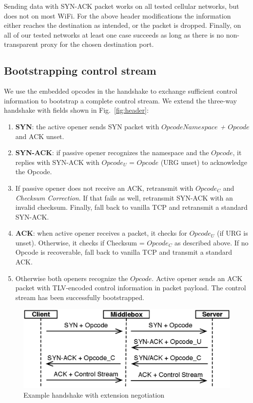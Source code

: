 \documentclass{sig-alternate-10pt}
\begin{document}
Sending data with SYN-ACK packet works on all tested cellular networks, but does not on most WiFi. For the above header modifications the information either reaches the destination as intended, or the packet is dropped. Finally, on all of our tested networks at least one case succeeds as long as there is no non-transparent proxy for the chosen destination port.

\subsection{Bootstrapping control stream}

We use the embedded opcodes in the handshake to exchange sufficient control information to bootstrap a complete control stream. We extend the three-way handshake with fields shown in Fig.~\ref{fig:header}:

\begin{enumerate}
\item \textbf{SYN}: the active opener sends SYN packet with \emph{$Opcode Namespace$ + $Opcode$} and ACK unset.
\item \textbf{SYN-ACK}: if passive opener recognizes the namespace and the $Opcode$, it replies with SYN-ACK with $Opcode_U$ = $Opcode$ (URG unset) to acknowledge the Opcode.
\item If passive opener does not receive an ACK, retransmit with $Opcode_C$ and \emph{Checksum Correction}. If that fails as well, retransmit SYN-ACK with an invalid checksum. Finally, fall back to vanilla TCP and retransmit a standard SYN-ACK.
\item \textbf{ACK}: when active opener receives a packet, it checks for $Opcode_U$ (if URG is unset). Otherwise, it checks if Checksum = $Opcode_C$ as described above. If no Opcode is recoverable, fall back to vanilla TCP and transmit a standard ACK.
\item Otherwise both openers recognize the $Opcode$. Active opener sends an ACK packet with TLV-encoded control information in packet payload. The control stream has been successfully bootstrapped.
\end{enumerate}

\begin{figure}[t!]
\centering
\includegraphics[width=.9\columnwidth]{figs/handshake}
\caption{Example handshake with extension negotiation}
\label{fig:handshake}
\vspace{-4mm}
\end{figure}
\end{document}
